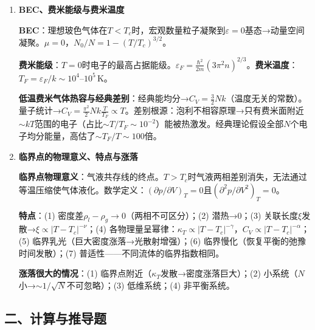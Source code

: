 \documentclass[12pt,a4paper,fontset=mac]{ctexart}
\newcommand{\đ}{\mathrm{đ}}
\begin{document}
\begin{enumerate}
\item \textbf{BEC、费米能级与费米温度}

\textbf{BEC}：理想玻色气体在$T<T_c$时，宏观数量粒子凝聚到$\varepsilon=0$基态→动量空间凝聚。$\mu=0$，$N_0/N=1-(T/T_c)^{3/2}$。

\textbf{费米能级}：$T=0$时电子的最高占据能级。$\varepsilon_F=\frac{\hbar^2}{2m}(3\pi^2n)^{2/3}$。\textbf{费米温度}：$T_F=\varepsilon_F/k\sim10^4\text{--}10^5\,\text{K}$。

\textbf{低温费米气体热容与经典差别}：经典能均分→$C_V=\frac{3}{2}Nk$（温度无关的常数）。量子统计→$C_V=\frac{\pi^2}{2}Nk\frac{T}{T_F}\propto T$。差别根源：泡利不相容原理→只有费米面附近$\sim kT$范围的电子（占比$\sim T/T_F\sim10^{-2}$）能被热激发。经典理论假设全部$N$个电子均分能量，高估了$\sim T_F/T\sim100$倍。

\item \textbf{临界点的物理意义、特点与涨落}

\textbf{临界点物理意义}：气液共存线的终点。$T>T_c$时气液两相差别消失，无法通过等温压缩使气体液化。数学定义：$(\partial p/\partial V)_T=0$且$(\partial^2p/\partial V^2)_T=0$。

\textbf{特点}：(1) 密度差$\rho_l-\rho_g\to0$（两相不可区分）；(2) 潜热→0；(3) 关联长度$\xi$发散→$\xi\propto|T-T_c|^{-\nu}$；(4) 各物理量呈幂律：$\kappa_T\propto|T-T_c|^{-\gamma}$，$C_V\propto|T-T_c|^{-\alpha}$；(5) 临界乳光（巨大密度涨落→光散射增强）；(6) 临界慢化（恢复平衡的弛豫时间发散）；(7) 普适性——不同流体的临界指数相同。

\textbf{涨落很大的情况}：(1) 临界点附近（$\kappa_T$发散→密度涨落巨大）；(2) 小系统（$N$小→$\sim1/\sqrt{N}$不可忽略）；(3) 低维系统；(4) 非平衡系统。

\end{enumerate}

\subsection*{二、计算与推导题}
\end{document}
